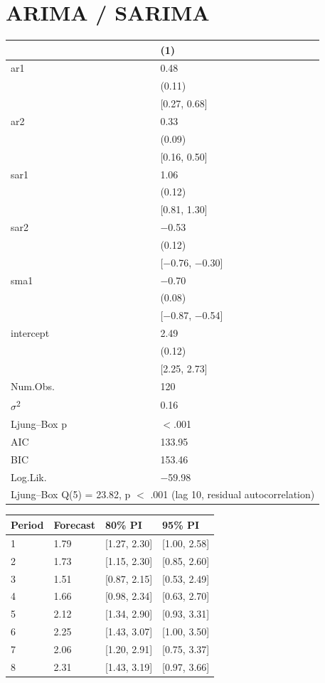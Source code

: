 \documentclass{article}
\begin{document}
\section{ARIMA / SARIMA}

\begin{tabular}{ll}
\toprule
 & (1) \\
\midrule
ar1 & 0.48 \\
 & (0.11) \\
 & [0.27, 0.68] \\
ar2 & 0.33 \\
 & (0.09) \\
 & [0.16, 0.50] \\
sar1 & 1.06 \\
 & (0.12) \\
 & [0.81, 1.30] \\
sar2 & $-$0.53 \\
 & (0.12) \\
 & [$-$0.76, $-$0.30] \\
sma1 & $-$0.70 \\
 & (0.08) \\
 & [$-$0.87, $-$0.54] \\
intercept & 2.49 \\
 & (0.12) \\
 & [2.25, 2.73] \\
\midrule
Num.Obs. & 120 \\
$\sigma$\textsuperscript{2} & 0.16 \\
Ljung--Box p & $<$.001 \\
AIC & 133.95 \\
BIC & 153.46 \\
Log.Lik. & $-$59.98 \\
\multicolumn{2}{l}{Ljung--Box Q(5) = 23.82, p $<$ .001 (lag 10, residual autocorrelation)} \\
\bottomrule
\end{tabular}

\begin{tabular}{llll}
\toprule
Period & Forecast & 80\% PI & 95\% PI \\
\midrule
1 & 1.79 & [1.27, 2.30] & [1.00, 2.58] \\
2 & 1.73 & [1.15, 2.30] & [0.85, 2.60] \\
3 & 1.51 & [0.87, 2.15] & [0.53, 2.49] \\
4 & 1.66 & [0.98, 2.34] & [0.63, 2.70] \\
5 & 2.12 & [1.34, 2.90] & [0.93, 3.31] \\
6 & 2.25 & [1.43, 3.07] & [1.00, 3.50] \\
7 & 2.06 & [1.20, 2.91] & [0.75, 3.37] \\
8 & 2.31 & [1.43, 3.19] & [0.97, 3.66] \\
\bottomrule
\end{tabular}
\end{document}
